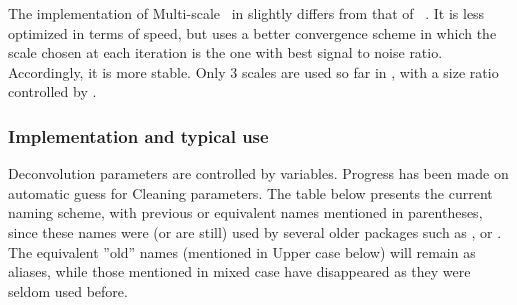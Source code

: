  
 The implementation of Multi-scale \clean\ in  \imager{} slightly differs 
 from that of \casa\ . It is less optimized in terms of speed, but uses
 a better convergence scheme in which the scale chosen at each iteration
 is the one with best signal to noise ratio. Accordingly, it is more
 stable. Only 3 scales are used so far in \imager , with a size ratio
 controlled by .

\subsubsection{Implementation and typical use}

Deconvolution parameters are controlled by  variables.
Progress has been made on automatic guess for Cleaning parameters.
The table below presents the current naming scheme, with previous or 
equivalent names mentioned in parentheses, since these names were 
(or are still) used by several older packages such as \mapping{}, \aips{} or \casa{}. 
The equivalent ''old'' names (mentioned in Upper case below) will remain 
as aliases, while those mentioned in mixed case have disappeared 
as they were seldom used before. 
 
